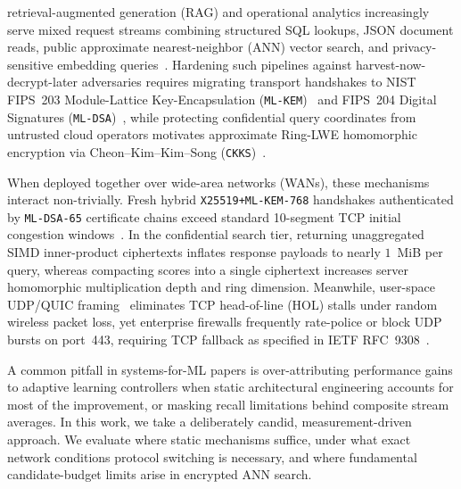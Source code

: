 \documentclass[10pt,journal,compsoc]{IEEEtran}
\begin{document}
\maketitle
\IEEEdisplaynontitleabstractindextext
\IEEEpeerreviewmaketitle

 retrieval-augmented generation (RAG) and operational analytics increasingly serve mixed request streams combining structured SQL lookups, JSON document reads, public approximate nearest-neighbor (ANN) vector search, and privacy-sensitive embedding queries~\cite{pan2024vectordbsurvey,chen2024bgem3,malkov2020hnsw}. Hardening such pipelines against harvest-now-decrypt-later adversaries requires migrating transport handshakes to NIST FIPS~203 Module-Lattice Key-Encapsulation (\texttt{ML-KEM})~\cite{nist_fips203_2024} and FIPS~204 Digital Signatures (\texttt{ML-DSA})~\cite{nist_fips204_2024}, while protecting confidential query coordinates from untrusted cloud operators motivates approximate Ring-LWE homomorphic encryption via Cheon--Kim--Kim--Song (\texttt{CKKS})~\cite{cheon2017ckks,albadawi2022openfhe}.

When deployed together over wide-area networks (WANs), these mechanisms interact non-trivially. Fresh hybrid \nolinkurl{X25519+ML-KEM-768} handshakes authenticated by \texttt{ML-DSA-65} certificate chains exceed standard 10-segment TCP initial congestion windows~\cite{paquin2020pqctls,sikeridis2020pqctls}. In the confidential search tier, returning unaggregated SIMD inner-product ciphertexts inflates response payloads to nearly $1$~MiB per query, whereas compacting scores into a single ciphertext increases server homomorphic multiplication depth and ring dimension. Meanwhile, user-space UDP/QUIC framing~\cite{langley2017quic,rfc9000,rfc9002} eliminates TCP head-of-line (HOL) stalls under random wireless packet loss, yet enterprise firewalls frequently rate-police or block UDP bursts on port~443, requiring TCP fallback as specified in IETF RFC~9308~\cite{rfc9308}.

A common pitfall in systems-for-ML papers is over-attributing performance gains to adaptive learning controllers when static architectural engineering accounts for most of the improvement, or masking recall limitations behind composite stream averages. In this work, we take a deliberately candid, measurement-driven approach. We evaluate where static mechanisms suffice, under what exact network conditions protocol switching is necessary, and where fundamental candidate-budget limits arise in encrypted ANN search.
\end{document}
